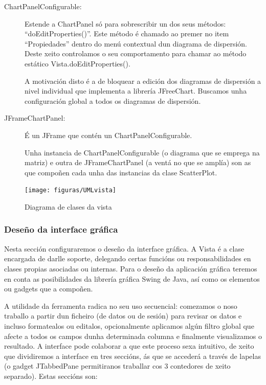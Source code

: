 \begin{description}
\item[ChartPanelConfigurable:] \hfill
Estende a ChartPanel só para sobrescribir un dos seus métodos: ``doEditProperties()''. Este método é chamado ao premer no item ``Propiedades'' dentro do menú contextual dun diagrama de dispersión. Deste xeito controlamos o seu comportamento para chamar ao método estático Vista.doEditProperties().

A motivación disto é a de bloquear a edición dos diagramas de dispersión a nivel individual que implementa a librería JFreeChart. Buscamos unha configuración global a todos os diagramas de dispersión.

\item[JFrameChartPanel:] \hfill

É un JFrame que contén un ChartPanelConfigurable.

Unha instancia de ChartPanelConfigurable (o diagrama que se emprega na matriz) e outra de JFrameChartPanel (a ventá no que se amplía) son as que compoñen cada unha das instancias da clase ScatterPlot.

\end{description}

\begin{figure}
\centering
\centerline{\texttt{[image: figuras/UMLvista]}}
\caption{Diagrama de clases da vista}
\label{UMLvista}
\end{figure}

\subsubsection{Deseño da interface gráfica}

Nesta sección configuraremos o deseño da interface gráfica. A Vista é a clase encargada de darlle soporte, delegando certas funcións ou responsabilidades en clases propias asociadas ou internas. Para o deseño da aplicación gráfica teremos en conta as posibilidades da librería gráfica Swing de Java, así como os elementos ou gadgets que a compoñen. 

A utilidade da ferramenta radica no seu uso secuencial: comezamos o noso traballo a partir dun ficheiro (de datos ou de sesión) para revisar os datos e incluso formatealos ou editalos, opcionalmente aplicamos algún filtro global que afecte a todos os campos dunha determinada columna e finalmente visualizamos o resultado. A interface pode colaborar a que este proceso sexa intuitivo, de xeito que dividiremos a interface en tres seccións, ás que se accederá a través de lapelas (o gadget JTabbedPane permitiranos traballar cos 3 contedores de xeito separado). Estas seccións son:

